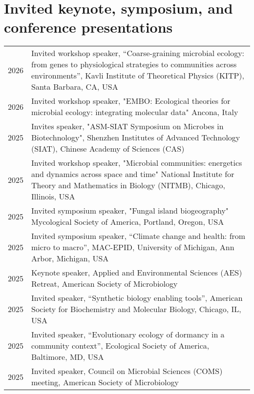 \documentclass[11pt]{article}
\begin{document}
\section*{Invited keynote, symposium, and conference presentations}
\vspace{-1.25em} %
\noindent
\begin{longtable}{@{}p{3em}@{\hspace{1.5em}}p{}@{}}

2026 & Invited workshop speaker, “Coarse-graining microbial ecology: from genes to physiological strategies to communities across environments”, Kavli Institute of Theoretical Physics (KITP), Santa Barbara, CA, USA \\

2026 & Invited workshop speaker, "EMBO: Ecological theories for microbial ecology: integrating molecular data" Ancona, Italy\\
2025 & Invites speaker, "ASM-SIAT Symposium on Microbes in Biotechnology", Shenzhen Institutes of Advanced Technology (SIAT), Chinese Academy of Sciences (CAS)\\

2025 & Invited workshop speaker,  "Microbial communities: energetics and dynamics across space and time" National Institute for Theory and Mathematics in Biology (NITMB), Chicago, Illinois, USA\\

2025 & Invited symposium speaker,  "Fungal island biogeography" Mycological Society of America, Portland, Oregon, USA\\

2025 & Invited symposium speaker, “Climate change and health: from micro to macro”, MAC-EPID, University of Michigan, Ann Arbor, Michigan, USA \\

2025 & Keynote speaker, Applied and Environmental Sciences (AES) Retreat, American Society of Microbiology \\

2025 & Invited speaker, “Synthetic biology enabling tools”, American Society for Biochemistry and Molecular Biology, Chicago, IL, USA \\

2025 & Invited speaker, “Evolutionary ecology of dormancy in a community context”, Ecological Society of America, Baltimore, MD, USA \\

2025 & Invited speaker, Council on Microbial Sciences (COMS) meeting, American Society of Microbiology \\


\end{longtable}
\end{document}
